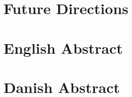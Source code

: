 \documentclass[a4paper, twoside]{report}
\begin{document}
\chapter{Future Directions}


\chapter{English Abstract}


\chapter{Danish Abstract}



\nocite{*}
\newpage
\printbibliography[heading=bibintoc,
title={References}]
\newpage


\end{document}
